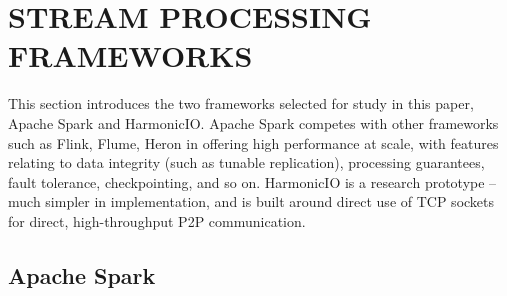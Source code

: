 \documentclass[conference]{IEEEtran}
\begin{document}
\section{STREAM PROCESSING FRAMEWORKS}\label{frameworks}


This section introduces the two frameworks selected for study in this paper, Apache Spark and HarmonicIO.
Apache Spark competes with other frameworks such as Flink, Flume, Heron in offering high performance at scale, with features relating to data integrity (such as tunable replication), processing guarantees, fault tolerance, checkpointing, and so on. HarmonicIO is a research prototype -- much simpler in implementation, and is built around direct use of TCP sockets for direct, high-throughput P2P communication.

\subsection{Apache Spark}

\end{document}
